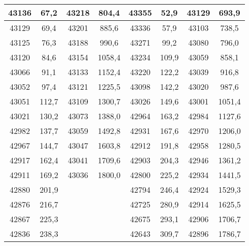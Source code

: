 \documentclass[11pt]{article}
\begin{document}
{{\begin{tabular}{|c|c|c|c|c|c|c|c|}
            \hline 
            43136 & 67,2 & \multicolumn{1}{c|}{43218} & 804,4 & 43355 & 52,9 & \multicolumn{1}{c|}{43129} & \multicolumn{1}{c|}{693,9}\tabularnewline
            \hline 
            43129 & 69,4 & \multicolumn{1}{c|}{43201} & 885,6 & 43336 & 57,9 & \multicolumn{1}{c|}{43103} & \multicolumn{1}{c|}{738,5}\tabularnewline
            \hline 
            43125 & 76,3 & \multicolumn{1}{c|}{43188} & 990,6 & 43271 & 99,2 & \multicolumn{1}{c|}{43080} & \multicolumn{1}{c|}{796,0}\tabularnewline
            \hline 
            43120 & 84,6 & \multicolumn{1}{c|}{43154} & 1058,4 & 43234 & 109,9 & \multicolumn{1}{c|}{43059} & \multicolumn{1}{c|}{858,1}\tabularnewline
            \hline 
            43066 & 91,1 & \multicolumn{1}{c|}{43133} & 1152,4 & 43220 & 122,2 & \multicolumn{1}{c|}{43039} & \multicolumn{1}{c|}{916,8}\tabularnewline
            \hline 
            43052 & 97,4 & \multicolumn{1}{c|}{43121} & 1225,5 & 43098 & 142,2 & \multicolumn{1}{c|}{43020} & \multicolumn{1}{c|}{987,6}\tabularnewline
            \hline 
            43051 & 112,7 & \multicolumn{1}{c|}{43109} & 1300,7 & 43026 & 149,6 & \multicolumn{1}{c|}{43001} & \multicolumn{1}{c|}{1051,4}\tabularnewline
            \hline 
            43021 & 130,2 & \multicolumn{1}{c|}{43073} & 1388,0 & 42964 & 163,2 & \multicolumn{1}{c|}{42984} & \multicolumn{1}{c|}{1127,6}\tabularnewline
            \hline 
            42982 & 137,7 & \multicolumn{1}{c|}{43059} & 1492,8 & 42931 & 167,6 & \multicolumn{1}{c|}{42970} & \multicolumn{1}{c|}{1206,0}\tabularnewline
            \hline 
            42967 & 144,7 & \multicolumn{1}{c|}{43047} & 1603,8 & 42912 & 191,8 & \multicolumn{1}{c|}{42958} & \multicolumn{1}{c|}{1280,5}\tabularnewline
            \hline 
            42917 & 162,4 & \multicolumn{1}{c|}{43041} & 1709,6 & 42903 & 204,3 & \multicolumn{1}{c|}{42946} & \multicolumn{1}{c|}{1361,2}\tabularnewline
            \hline 
            42911 & 169,2 & \multicolumn{1}{c|}{43036} & 1800,0 & 42800 & 225,2 & \multicolumn{1}{c|}{42934} & \multicolumn{1}{c|}{1441,5}\tabularnewline
            \hline 
            42880 & 201,9 &  &  & 42794 & 246,4 & \multicolumn{1}{c|}{42924} & \multicolumn{1}{c|}{1529,3}\tabularnewline
            \cline{1-2} \cline{5-8} 
            42876 & 216,7 &  &  & 42725 & 280,9 & \multicolumn{1}{c|}{42914} & \multicolumn{1}{c|}{1625,5}\tabularnewline
            \cline{1-2} \cline{5-8} 
            42867 & 225,3 &  &  & 42675 & 293,1 & \multicolumn{1}{c|}{42906} & \multicolumn{1}{c|}{1706,7}\tabularnewline
            \cline{1-2} \cline{5-8} 
            42836 & 238,3 &  &  & 42643 & 309,7 & \multicolumn{1}{c|}{42896} & \multicolumn{1}{c|}{1786,7}\tabularnewline

\end{tabular}}}
\end{document}
